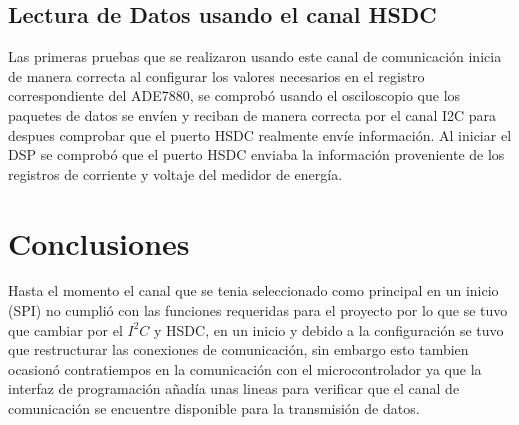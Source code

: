 \documentclass[letterpaper,12pt,oneside]{book}
\begin{document}
		\section{Lectura de Datos usando el canal HSDC}
		Las primeras pruebas que se realizaron usando este canal de comunicación inicia de manera correcta al configurar los valores necesarios en el registro correspondiente del ADE7880, se comprobó usando el osciloscopio que los paquetes de datos se envíen y reciban de manera correcta por el canal I2C para despues comprobar que el puerto HSDC realmente envíe información.
		Al iniciar el DSP se comprobó que el puerto HSDC enviaba la información proveniente de los registros de corriente y voltaje del medidor de energía.
	\chapter{Conclusiones}
	Hasta el momento el canal que se tenia seleccionado como principal en un inicio (SPI) no cumplió con las funciones requeridas para el proyecto por lo que se tuvo que cambiar por el $I^2C$ y HSDC, en un inicio y debido a la configuración se tuvo que restructurar las conexiones de comunicación, sin embargo esto tambien ocasionó contratiempos en la comunicación con el microcontrolador ya que la interfaz de programación añadía unas lineas para verificar que el canal de comunicación se encuentre disponible para la transmisión de datos.
\end{document}
